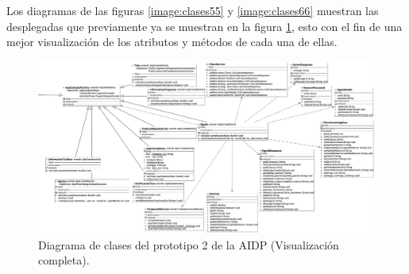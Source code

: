 Los diagramas de las figuras \ref{image:clases55} y \ref{image:clases66} muestran las desplegadas que previamente ya se muestran en la figura \ref{image:clases44}, esto con el fin de una mejor visualización de los atributos y métodos de cada una de ellas.

\FloatBarrier
\begin{figure}[htbp!]
		\centering
			\includegraphics[width=1.1 \textwidth]{imagenes/aidp_clases/home2}
		\caption{Diagrama de clases del prototipo 2 de la AIDP (Visualización completa).}
		\label{image:clases44}
\end{figure}
\FloatBarrier


